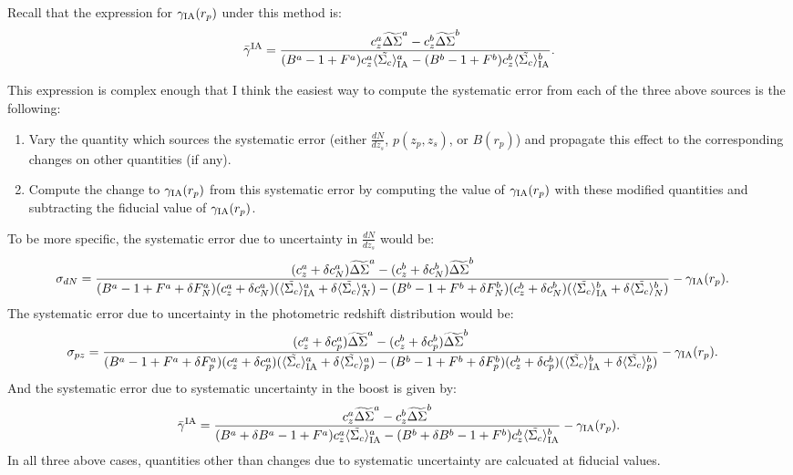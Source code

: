 \documentclass[onecolumn,amsmath,aps,fleqn, superscriptaddress]{revtex4}
\begin{document}
Recall that the expression for $\gamma_{\rm IA}(r_p)$ under this method is:
\begin{equation}
\bar{\gamma}^{\rm IA} = \frac{c_z^a \widetilde{\Delta\Sigma}^a - c_z^b \widetilde{\Delta\Sigma}^b}{(B^a-1+F^a)c_z^a \langle \tilde{\Sigma_c}\rangle_{\rm IA}^a -(B^b-1+F^b)c_z^b \langle \tilde{\Sigma_c}\rangle_{\rm IA}^b}.
\label{gamma_sol}
\end{equation}

This expression is complex enough that I think the easiest way to compute the systematic error from each of the three above sources is the following:
\begin{enumerate}
\item{Vary the quantity which sources the systematic error (either $\frac{dN}{dz_s}$, $p(z_p, z_s)$, or $B(r_p)$) and propagate this effect to the corresponding changes on other quantities (if any).}
\item{Compute the change to $\gamma_{\rm IA}(r_p)$ from this systematic error by computing the value of $\gamma_{\rm IA}(r_p)$ with these modified quantities and subtracting the fiducial value of $\gamma_{\rm IA}(r_p)$.}
\end{enumerate}

To be more specific, the systematic error due to uncertainty in $\frac{dN}{dz_s}$ would be:
\begin{align}
\sigma_{dN} &= \frac{(c^a_{z} + \delta c_{N}^{a}) \widetilde{\Delta\Sigma}^a - (c^b_{z} + \delta c_{N}^{b}) \widetilde{\Delta\Sigma}^b}{(B^a-1+F^a + \delta F^a_{N})(c^a_{z} + \delta c_{N}^{a}) (\langle \tilde{\Sigma_c}\rangle_{\rm IA}^a + \delta \langle \tilde{\Sigma_c}\rangle_{N}^{a}) -(B^b-1+F^b + \delta F^b_{N})(c^b_{z} + \delta c_{N}^{b}) (\langle \tilde{\Sigma_c}\rangle_{\rm IA}^b + \delta \langle \tilde{\Sigma_c}\rangle_{N}^{b})} - \gamma_{\rm IA}(r_p).
\label{sigmadNsys}
\end{align}
The systematic error due to uncertainty in the photometric redshift distribution would be:
\begin{align}
\sigma_{pz} &= \frac{(c^a_{z} + \delta c_{p}^{a}) \widetilde{\Delta\Sigma}^a - (c^b_{z} + \delta c_{p}^{b}) \widetilde{\Delta\Sigma}^b}{(B^a-1+F^a + \delta F^a_{p})(c^a_{z} + \delta c_{p}^{a}) (\langle \tilde{\Sigma_c}\rangle_{\rm IA}^a + \delta \langle \tilde{\Sigma_c}\rangle_{p}^{a}) -(B^b-1+F^b + \delta F^b_{p})(c^b_{z} + \delta c_{p}^{b}) (\langle \tilde{\Sigma_c}\rangle_{\rm IA}^b + \delta \langle \tilde{\Sigma_c}\rangle_{p}^{b})} - \gamma_{\rm IA}(r_p).
\label{sigmapzsys}
\end{align}
And the systematic error due to systematic uncertainty in the boost is given by: 
\begin{equation}
\bar{\gamma}^{\rm IA} = \frac{c_z^a \widetilde{\Delta\Sigma}^a - c_z^b \widetilde{\Delta\Sigma}^b}{(B^a +\delta B^a-1+F^a)c_z^a \langle \tilde{\Sigma_c}\rangle_{\rm IA}^a -(B^b + \delta B^b-1+F^b)c_z^b \langle \tilde{\Sigma_c}\rangle_{\rm IA}^b}- \gamma_{\rm IA}(r_p) .
\label{sigmaBsys}
\end{equation}
In all three above cases, quantities other than changes due to systematic uncertainty are calcuated at fiducial values.
\end{document}
